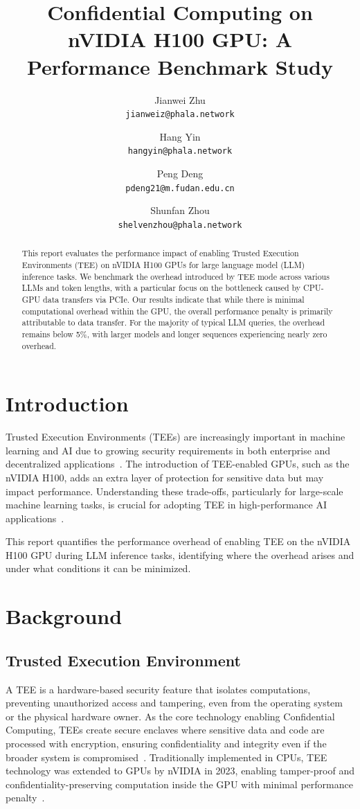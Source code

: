 \documentclass{article}
\title{Confidential Computing on nVIDIA H100 GPU: A Performance Benchmark Study}
\author{
  Jianwei Zhu \\
  \texttt{jianweiz@phala.network}
  \and
  Hang Yin \\
  \texttt{hangyin@phala.network}
  \and
  Peng Deng \\
  \texttt{pdeng21@m.fudan.edu.cn}
  \and
  Shunfan Zhou \\
  \texttt{shelvenzhou@phala.network}
}
\begin{document}
\maketitle

\begin{abstract}
    This report evaluates the performance impact of enabling Trusted Execution Environments (TEE) on nVIDIA H100 GPUs for large language model (LLM) inference tasks. We benchmark the overhead introduced by TEE mode across various LLMs and token lengths, with a particular focus on the bottleneck caused by CPU-GPU data transfers via PCIe. Our results indicate that while there is minimal computational overhead within the GPU, the overall performance penalty is primarily attributable to data transfer. For the majority of typical LLM queries, the overhead remains below 5\%, with larger models and longer sequences experiencing nearly zero overhead.
\end{abstract}

\section{Introduction}

Trusted Execution Environments (TEEs) are increasingly important in machine learning and AI due to growing security requirements in both enterprise and decentralized applications~\cite{sabt2015trusted, matetic2018delegatee, ayoade2018decentralized}. The introduction of TEE-enabled GPUs, such as the nVIDIA H100, adds an extra layer of protection for sensitive data but may impact performance. Understanding these trade-offs, particularly for large-scale machine learning tasks, is crucial for adopting TEE in high-performance AI applications~\cite{yudha2022lite, wang2024confidential}.

This report quantifies the performance overhead of enabling TEE on the nVIDIA H100 GPU during LLM inference tasks, identifying where the overhead arises and under what conditions it can be minimized.

\section{Background}

\subsection{Trusted Execution Environment}

A TEE is a hardware-based security feature that isolates computations, preventing unauthorized access and tampering, even from the operating system or the physical hardware owner. As the core technology enabling Confidential Computing, TEEs create secure enclaves where sensitive data and code are processed with encryption, ensuring confidentiality and integrity even if the broader system is compromised~\cite{sabt2015trusted}. Traditionally implemented in CPUs, TEE technology was extended to GPUs by nVIDIA in 2023, enabling tamper-proof and confidentiality-preserving computation inside the GPU with minimal performance penalty~\cite{dhanuskodi2023creating}.
\end{document}

